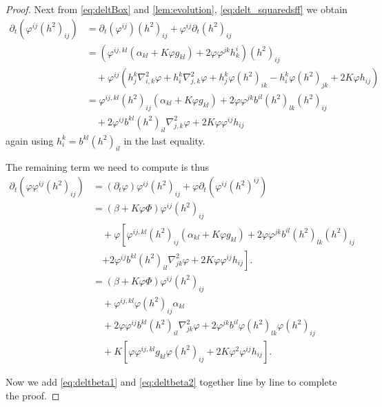 \documentclass{amsart}
\begin{document}
\begin{proof}
Next from \cref{eq:deltBox} and \cref{lem:evolution}, \cref{eq:delt_squaredsff} we obtain
\[
\begin{split}
\partial_{t} (\varphi^{ij}(h^2)_{ij}) &= \partial_{t}(\varphi^{ij}) (h^2)_{ij} + \varphi^{ij} \partial_t (h^2)_{ij} \\
&= \left(\varphi^{ij,kl} \left(\alpha_{kl} + K \varphi g_{kl}\right) + 2\varphi\varphi^{jk}h^{i}_{k}\right) (h^2)_{ij} \\
&\quad + \varphi^{ij} \left(h^k_j \nabla^2_{i,k} \varphi + h^k_i \nabla^2_{j,k} \varphi + h^k_j \varphi(h^2)_{ik} - h^k_i \varphi(h^2)_{jk} + 2K\varphi h_{ij}\right) \\
&= \varphi^{ij,kl} (h^2)_{ij} \left(\alpha_{kl} + K \varphi g_{kl}\right) + 2\varphi\varphi^{jk} b^{il} (h^2)_{lk} (h^2)_{ij} \\
&\quad + 2 \varphi^{ij} b^{kl} (h^2)_{il} \nabla^2_{j,k} \varphi  + 2K\varphi\varphi^{ij}h_{ij}
\end{split}
\]
again using \(h^k_i = b^{kl} (h^2)_{il}\) in the last equality.

The remaining term we need to compute is thus
\begin{equation}
\label{eq:deltbeta2}
\begin{split}
\partial_{t} (\varphi \varphi^{ij}(h^2)_{ij}) &= (\partial_{t} \varphi) \varphi^{ij}(h^2)_{ij} + \varphi \partial_t (\varphi^{ij} (h^2)^{ij}) \\
&= (\beta + K \varphi\Phi) \varphi^{ij}(h^2)_{ij} \\
&\quad + \varphi \left[\varphi^{ij,kl} (h^2)_{ij} \left(\alpha_{kl} + K \varphi g_{kl}\right) + 2\varphi\varphi^{jk} b^{il} (h^2)_{lk} (h^2)_{ij} \right.\\
&\quad \left. + 2 \varphi^{ij} b^{kl} (h^2)_{il} \nabla^2_{jk} \varphi  + 2K\varphi\varphi^{ij}h_{ij}\right]. \\
&= (\beta + K \varphi\Phi) \varphi^{ij}(h^2)_{ij} \\
&\quad + \varphi^{ij,kl} \varphi (h^2)_{ij} \alpha_{kl}  \\
&\quad + 2 \varphi\varphi^{ij} b^{kl} (h^2)_{il} \nabla^2_{jk} \varphi + 2\varphi^{jk} b^{il} \varphi (h^2)_{lk} \varphi (h^2)_{ij} \\
&\quad + K \left[\varphi \varphi^{ij,kl} g_{kl} \varphi (h^2)_{ij} + 2K\varphi^2\varphi^{ij}h_{ij}\right].
\end{split}
\end{equation}

Now we add \cref{eq:deltbeta1} and \cref{eq:deltbeta2} together line by line to complete the proof.
\end{proof}
\end{document}
